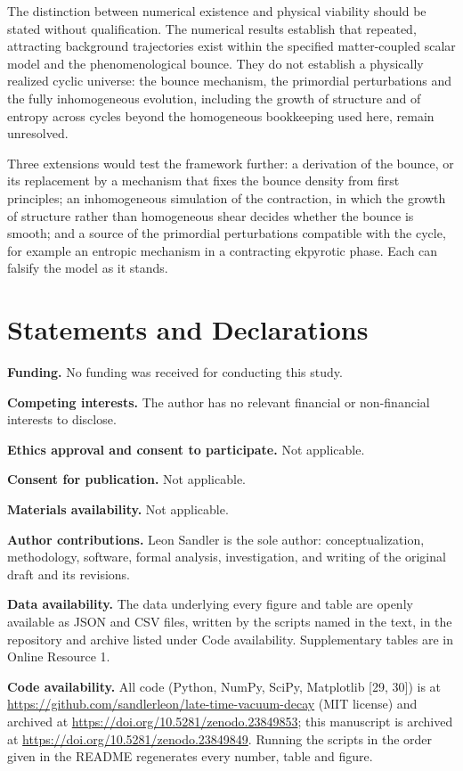 \documentclass[pdflatex,sn-mathphys-num]{sn-jnl}
\begin{document}
The distinction between numerical existence and physical viability should be stated without qualification. The numerical results establish that repeated, attracting background trajectories exist within the specified matter-coupled scalar model and the phenomenological bounce. They do not establish a physically realized cyclic universe: the bounce mechanism, the primordial perturbations and the fully inhomogeneous evolution, including the growth of structure and of entropy across cycles beyond the homogeneous bookkeeping used here, remain unresolved.

Three extensions would test the framework further: a derivation of the bounce, or its replacement by a mechanism that fixes the bounce density from first principles; an inhomogeneous simulation of the contraction, in which the growth of structure rather than homogeneous shear decides whether the bounce is smooth; and a source of the primordial perturbations compatible with the cycle, for example an entropic mechanism in a contracting ekpyrotic phase. Each can falsify the model as it stands.

\backmatter

\section*{Statements and Declarations}
\noindent\textbf{Funding.} No funding was received for conducting this study.

\noindent\textbf{Competing interests.} The author has no relevant financial or non-financial interests to disclose.

\noindent\textbf{Ethics approval and consent to participate.} Not applicable.

\noindent\textbf{Consent for publication.} Not applicable.

\noindent\textbf{Materials availability.} Not applicable.

\noindent\textbf{Author contributions.} Leon Sandler is the sole author: conceptualization, methodology, software, formal analysis, investigation, and writing of the original draft and its revisions.

\noindent\textbf{Data availability.} The data underlying every figure and table are openly available as JSON and CSV files, written by the scripts named in the text, in the repository and archive listed under Code availability. Supplementary tables are in Online Resource 1.

\noindent\textbf{Code availability.} All code (Python, NumPy, SciPy, Matplotlib [29, 30]) is at \url{https://github.com/sandlerleon/late-time-vacuum-decay} (MIT license) and archived at \url{https://doi.org/10.5281/zenodo.23849853}; this manuscript is archived at \url{https://doi.org/10.5281/zenodo.23849849}. Running the scripts in the order given in the README regenerates every number, table and figure.
\end{document}
